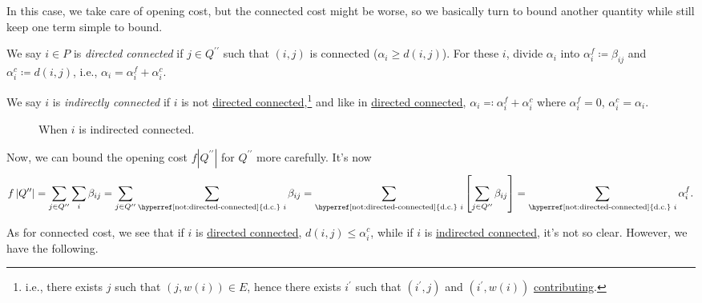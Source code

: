 \begin{note}
	In this case, we take care of opening cost, but the connected cost might be worse, so we basically turn to bound another quantity while still keep one term simple to bound.
\end{note}

\begin{notation}\label{not:directed-connected}
	We say \(i\in P\) is \emph{directed connected} if \(j\in Q^{\prime\prime} \) such that \((i, j)\) is connected (\(\alpha _{i} \geq d(i, j)\)). For these \(i\), divide \(\alpha _i\) into \(\alpha _i^f \coloneqq \beta _{ij}\) and \(\alpha _i^c\coloneqq d(i, j)\), i.e., \(\alpha _i = \alpha _i^f + \alpha _i^c\).
\end{notation}

\begin{notation}\label{not:indirected-connected}
	We say \(i\) is \emph{indirectly connected} if \(i\) is not \hyperref[not:directed-connected]{directed connected},\footnote{i.e.,  there exists \(j\) such that \((j, w(i))\in E\), hence there exists \(i^\prime\) such that \((i^\prime , j)\) and \((i^\prime , w(i))\) \hyperref[not:contributing]{contributing}.} and like in \hyperref[not:directed-connected]{directed connected}, \(\alpha_i \eqqcolon \alpha _i^f + \alpha _i^c\) where \(\alpha _i^f = 0\), \(\alpha _i^c = \alpha _i\).
	\begin{figure}[H]
		\centering
		\caption{When \(i\) is indirected connected.}
		\label{fig:indirected-connected}
	\end{figure}
\end{notation}

Now, we can bound the opening cost \(f\left\vert Q^{\prime\prime} \right\vert\) for \(Q^{\prime\prime} \) more carefully. It's now
\[
	f \left\vert Q^{\prime\prime}  \right\vert
	= \sum_{j\in Q^{\prime\prime} } \sum_{i} \beta _{ij} = \sum_{j\in Q^{\prime\prime} } \sum_{\text{\hyperref[not:directed-connected]{d.c.} }i} \beta _{ij}
	= \sum_{\text{\hyperref[not:directed-connected]{d.c.} }i} \left[ \sum_{j\in Q^{\prime\prime}} \beta _{ij} \right]
	= \sum_{\text{\hyperref[not:directed-connected]{d.c.} }i} \alpha _i^f.
\]

As for connected cost, we see that if \(i\) is \hyperref[not:directed-connected]{directed connected}, \(d(i, j) \leq \alpha _i^c\), while if \(i\) is \hyperref[not:indirected-connected]{indirected connected}, it's not so clear. However, we have the following.

